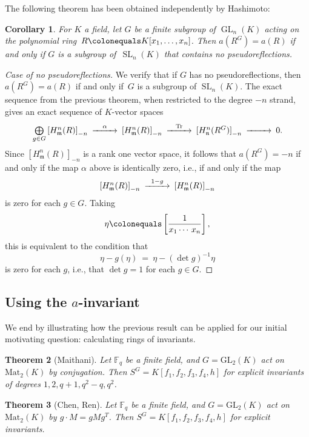 \documentclass[12pt]{amsart}
\newtheorem{theorem}{Theorem}[section]
\newtheorem{corollary}[theorem]{Corollary}
\theoremstyle{definition}
\numberwithin{equation}{theorem}
\def\GL{\operatorname{GL}}
\def\SL{\operatorname{SL}}
\def\Tr{\operatorname{Tr}}
\def\frakm{\mathfrak{m}}
\def\frakn{\mathfrak{n}}
\def\FF{\mathbb{F}}
\begin{document}
The following theorem has been obtained independently by Hashimoto:

\begin{corollary}
\label{theorem:a:invariant}
For $K$ a field, let $G$ be a finite subgroup of $\GL_n(K)$ acting on the polynomial ring~$R\colonequals K[x_1,\dots,x_n]$. Then $a(R^G)=a(R)$ if and only if $G$ is a subgroup of~$\SL_n(K)$ that contains no pseudoreflections.
\end{corollary}

\begin{proof}[Case of no pseudoreflections]
We verify that if $G$ has no pseudoreflections, then $a(R^G)=a(R)$ if and only if~$G$ is a subgroup of $\SL_n(K)$. The exact sequence from the previous theorem, when restricted to the degree $-n$ strand, gives an exact sequence of $K$-vector spaces
\[
\CD
\bigoplus\limits_{g \in G} {[H^n_\frakm(R)]}_{-n} @>{\alpha}>> {[H^n_\frakm(R)]}_{-n} @>\Tr>> {[H^n_\frakn(R^G)]}_{-n} @>>> 0.
\endCD
\]
Since ${[H^n_\frakm(R)]}_{-n}$ is a rank one vector space, it follows that $a(R^G)=-n$ if and only if the map $\alpha$ above is identically zero, i.e., if and only if the map
\[
\CD
{[H^n_\frakm(R)]}_{-n} @>{1-g}>> {[H^n_\frakm(R)]}_{-n}
\endCD
\]
is zero for each $g\in G$. Taking
\[
\eta\colonequals\left[\frac{1}{x_1\cdots\,x_n}\right],
\]
 this is equivalent to the condition that
\[
\eta-g(\eta)\ =\ \eta-(\det g)^{-1}\eta
\]
is zero for each $g$, i.e., that $\det g=1$ for each $g\in G$.
\end{proof}

\subsection*{Using the $a$-invariant} We end by illustrating how the previous result can be applied for our initial motivating question: calculating rings of invariants.

\begin{theorem}[Maithani] Let $\FF_q$ be a finite field, and $G=\mathrm{GL}_2(K)$ act on $\mathrm{Mat}_2(K)$ by conjugation. Then $S^G= K[f_1,f_2,f_3,f_4,h]$ for explicit invariants of degrees $1,2,q+1,q^2-q,q^2$.
\end{theorem}

\begin{theorem}[Chen, Ren] Let $\FF_q$ be a finite field, and $G=\mathrm{GL}_2(K)$ act on $\mathrm{Mat}_2(K)$ by $g\cdot M = g M g^{T}$. Then $S^G= K[f_1,f_2,f_3,f_4,h]$ for explicit invariants.
\end{theorem}
\end{document}
